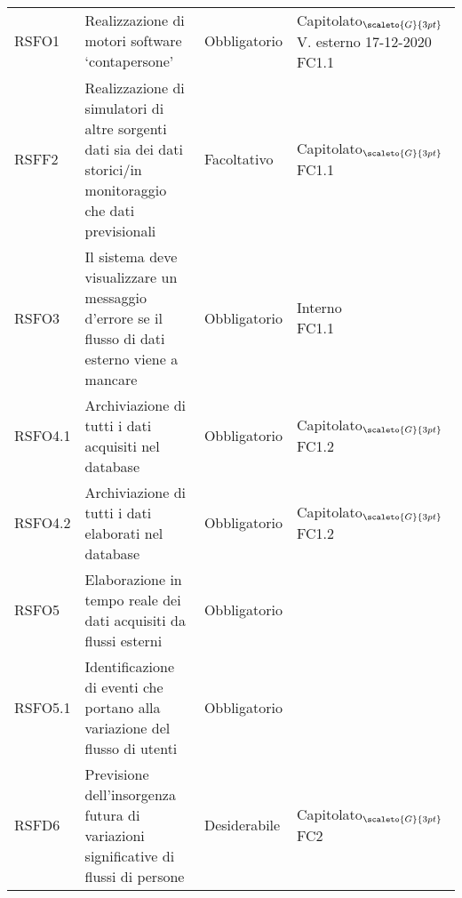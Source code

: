 \def\tabularxcolumn#1{m{#1}}
{

	\begin{center}
		\renewcommand{\arraystretch}{1.4}
		\begin{longtable}{|p{3cm}|p{4cm}|p{4cm}|p{4cm}|}
			\hline
			\rowcolor{airforceblue}
			\makecell[c]{\textbf{Codice RS}} & \makecell[c]{\textbf{Descrizione}} & \makecell[c]{\textbf{Tipo di requisito}} & \makecell[c]{\textbf{Fonte}} \\
			\hline
			\centering RSFO1 & Realizzazione di motori software ‘contapersone’  &\centering  Obbligatorio & \makecell[tc]{Capitolato$_{\scaleto{G}{3pt}}$ \\ V. esterno 17-12-2020 \\ FC1.1} \\
			\hline
			\centering RSFF2 & Realizzazione di simulatori di altre sorgenti dati sia dei dati storici/in monitoraggio che dati previsionali & \centering Facoltativo & \makecell[tc]{Capitolato$_{\scaleto{G}{3pt}}$ \\ FC1.1} \\
			\hline
			\centering RSFO3  & Il sistema deve visualizzare un messaggio d'errore se il flusso di dati esterno viene a mancare  &\centering  Obbligatorio & \makecell[tc]{Interno\\FC1.1}  \\
			\hline
			\centering RSFO4.1 & Archiviazione di tutti i dati acquisiti nel database & \centering Obbligatorio & \makecell[tc]{Capitolato$_{\scaleto{G}{3pt}}$ \\ FC1.2}  \\
			\hline
			\centering RSFO4.2 & Archiviazione di tutti i dati elaborati nel database & \centering Obbligatorio & \makecell[tc]{Capitolato$_{\scaleto{G}{3pt}}$ \\ FC1.2}  \\
			\hline
			\centering RSFO5 & Elaborazione in tempo reale dei dati acquisiti da flussi esterni &\centering  Obbligatorio & \makecell[tc]{Capitolato$_{\scaleto{G}{3pt}}$}  \\
			\hline
			\centering RSFO5.1 & Identificazione di eventi che portano alla variazione del flusso di utenti &\centering  Obbligatorio & \makecell[tc]{Capitolato$_{\scaleto{G}{3pt}}$}  \\
			\hline
			\centering RSFD6 & Previsione dell'insorgenza futura di variazioni significative di flussi di persone & \centering Desiderabile & \makecell[tc]{Capitolato$_{\scaleto{G}{3pt}}$ \\ FC2}  \\

\end{longtable}
\end{center}}
